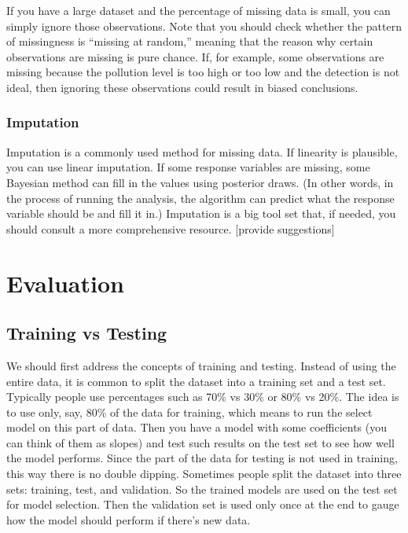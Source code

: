 \documentclass[
]{book}
\begin{document}
If you have a large dataset and the percentage of missing data is small, you can simply ignore those observations. Note that you should check whether the pattern of missingness is ``missing at random,'' meaning that the reason why certain observations are missing is pure chance. If, for example, some observations are missing because the pollution level is too high or too low and the detection is not ideal, then ignoring these observations could result in biased conclusions.

\hypertarget{imputation}{%
\subsection{Imputation}\label{imputation}}

Imputation is a commonly used method for missing data. If linearity is plausible, you can use linear imputation. If some response variables are missing, some Bayesian method can fill in the values using posterior draws. (In other words, in the process of running the analysis, the algorithm can predict what the response variable should be and fill it in.) Imputation is a big tool set that, if needed, you should consult a more comprehensive resource. {[}provide suggestions{]}

\hypertarget{evaluation}{%
\chapter{Evaluation}\label{evaluation}}

\hypertarget{training-vs-testing}{%
\section{Training vs Testing}\label{training-vs-testing}}

We should first address the concepts of training and testing. Instead of using the entire data, it is common to split the dataset into a training set and a test set. Typically people use percentages such as 70\% vs 30\% or 80\% vs 20\%. The idea is to use only, say, 80\% of the data for training, which means to run the select model on this part of data. Then you have a model with some coefficients (you can think of them as slopes) and test such results on the test set to see how well the model performs. Since the part of the data for testing is not used in training, this way there is no double dipping. Sometimes people split the dataset into three sets: training, test, and validation. So the trained models are used on the test set for model selection. Then the validation set is used only once at the end to gauge how the model should perform if there's new data.
\end{document}
